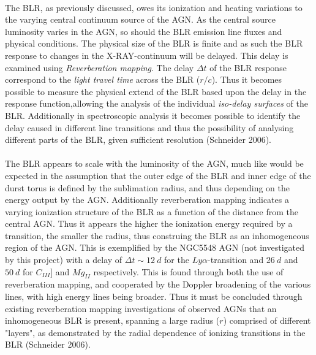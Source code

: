 \documentclass[a4paper, 12pt, twoside]{article}
\begin{document}
\\
The BLR, as previously discussed, owes its ionization and heating variations to the varying central continuum source of the AGN. As the central source luminosity varies in the AGN, so should the BLR emission line fluxes and physical conditions. The physical size of the BLR is finite and as such the BLR response to changes in the X-RAY-continuum will be delayed. This delay is examined using \emph{Reverberation mapping}. The delay $\Delta t$ of the BLR response correspond to the \emph{light travel time} across the BLR ($r/c$). Thus it becomes possible to measure the physical extend of the BLR based upon the delay in the response function,allowing the analysis of the individual \emph{iso-delay surfaces} of the BLR. Additionally in spectroscopic analysis it becomes possible to identify the delay caused in different line transitions and thus the possibility of analysing different parts of the BLR, given sufficient resolution (Schneider 2006).\\
\\
The BLR appears to scale with the luminosity of the AGN, much like would be expected in the assumption that the outer edge of the BLR and inner edge of the durst torus is defined by the sublimation radius, and thus depending on the energy output by the AGN. Additionally reverberation mapping indicates a varying ionization structure of the BLR as a function of the distance from the central AGN. Thus it appears the higher the ionization energy required by a transition, the smaller the radius, thus construing the BLR as an inhomogeneous region of the AGN. This is exemplified by the NGC5548 AGN (not investigated by this project) with a delay of $\Delta t\sim 12\ d$ for the $Ly \alpha$-transition and $26\ d$ and $50\ d$ for $C_{III}]$ and $Mg_{II}$ respectively. This is found through both the use of reverberation mapping, and cooperated by the Doppler broadening of the various lines, with high energy lines being broader. Thus it must be concluded through existing reverberation mapping investigations of observed AGNs that an inhomogeneous BLR is present, spanning a large radius ($r$) comprised of different "layers", as demonstrated by the radial dependence of ionizing transitions in the BLR (Schneider 2006). \\
\\
\end{document}
